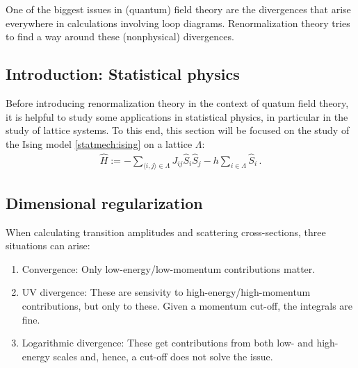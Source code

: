     One of the biggest issues in (quantum) field theory are the divergences that arise everywhere in calculations involving loop diagrams. Renormalization theory tries to find a way around these (nonphysical) divergences.

\subsection{Introduction: Statistical physics}

    Before introducing renormalization theory in the context of quatum field theory, it is helpful to study some applications in statistical physics, in particular in the study of lattice systems. To this end, this section will be focused on the study of the Ising model \ref{statmech:ising} on a lattice $\Lambda$:
    \begin{gather}
        \widehat{H} := -\sum_{\langle i,j \rangle\in\Lambda}J_{ij}\widehat{S}_i\widehat{S}_j-h\sum_{i\in\Lambda}\widehat{S}_i\,.
    \end{gather}

\subsection{Dimensional regularization}

    When calculating transition amplitudes and scattering cross-sections, three situations can arise:
    \begin{enumerate}
        \item Convergence: Only low-energy/low-momentum contributions matter.
        \item UV divergence: These are sensivity to high-energy/high-momentum contributions, but only to these. Given a momentum cut-off, the integrals are fine.
        \item Logarithmic divergence: These get contributions from both low- and high-energy scales and, hence, a cut-off does not solve the issue.
    \end{enumerate}


